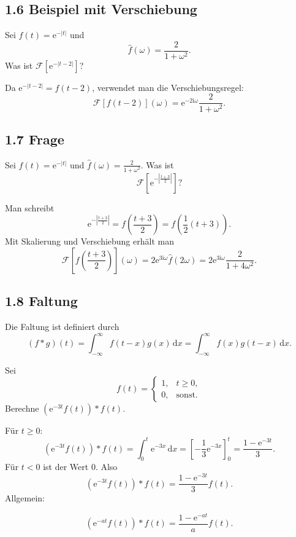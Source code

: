 \documentclass[11pt,a4paper]{article}
\newcommand{\ii}{\mathrm i}
\newcommand{\ee}{\mathrm e}
\newcommand{\dd}{\,\mathrm d}
\begin{document}
\subsection{1.6 Beispiel mit Verschiebung}
\begin{beispielbox}
Sei $f(t)=\ee^{-|t|}$ und
\[
\widehat f(\omega)=\frac{2}{1+\omega^2}.
\]
Was ist $\mathcal F[\ee^{-|t-2|}]$?
\end{beispielbox}
Da $\ee^{-|t-2|}=f(t-2)$, verwendet man die Verschiebungsregel:
\[
\mathcal F[f(t-2)](\omega)=\ee^{-2\ii\omega}\frac{2}{1+\omega^2}.
\]

\subsection{1.7 Frage}
\begin{fragebox}
Sei $f(t)=\ee^{-|t|}$ und $\widehat f(\omega)=\frac{2}{1+\omega^2}$. Was ist
\[
\mathcal F\left[\ee^{-\left|\frac{t+3}{2}\right|}\right]?
\]
\end{fragebox}
\begin{antwortbox}
Man schreibt
\[
\ee^{-\left|\frac{t+3}{2}\right|}=f\left(\frac{t+3}{2}\right)=f\left(\frac12(t+3)\right).
\]
Mit Skalierung und Verschiebung erhält man
\[
\mathcal F\left[f\left(\frac{t+3}{2}\right)\right](\omega)
=2\ee^{3\ii\omega}\widehat f(2\omega)
=2\ee^{3\ii\omega}\frac{2}{1+4\omega^2}.
\]
\end{antwortbox}

\subsection{1.8 Faltung}
\begin{importantbox}
Die Faltung ist definiert durch
\[
(f*g)(t)=\int_{-\infty}^{\infty}f(t-x)g(x)\dd x
=\int_{-\infty}^{\infty}f(x)g(t-x)\dd x.
\]
\end{importantbox}

\begin{beispielbox}
Sei
\[
f(t)=\begin{cases}1,&t\ge0,\\0,&\text{sonst.}\end{cases}
\]
Berechne $(\ee^{-3t}f(t))*f(t)$.
\end{beispielbox}
Für $t\ge0$:
\[
(\ee^{-3t}f(t))*f(t)=\int_0^t \ee^{-3x}\dd x=\left[-\frac13\ee^{-3x}\right]_0^t=\frac{1-\ee^{-3t}}{3}.
\]
Für $t<0$ ist der Wert $0$. Also
\[
(\ee^{-3t}f(t))*f(t)=\frac{1-\ee^{-3t}}{3}f(t).
\]
Allgemein:
\begin{importantbox}
\[
(\ee^{-at}f(t))*f(t)=\frac{1-\ee^{-at}}{a}f(t).
\]
\end{importantbox}
\end{document}
